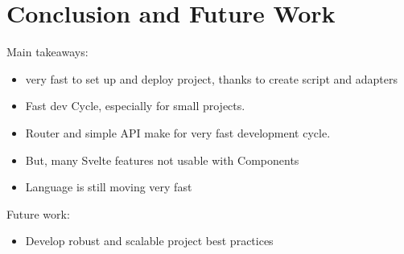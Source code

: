 \chapter{Conclusion and Future Work}
\label{ch:conclusion}

Main takeaways:
\begin{itemize}
  \item very fast to set up and deploy project, thanks to create script and adapters
  \item Fast dev Cycle, especially for small projects. 
  \item Router and simple API make for very fast development cycle.
  \item But, many Svelte features not usable with Components
  \item Language is still moving very fast
\end{itemize}

Future work:
\begin{itemize}
  \item Develop robust and scalable project best practices
\end{itemize}